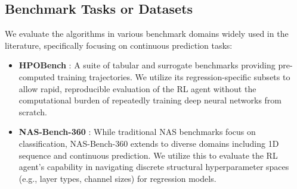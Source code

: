\documentclass[12pt]{article}
\begin{document}
\subsection*{Benchmark Tasks or Datasets}
We evaluate the algorithms in various benchmark domains widely used in the literature, specifically focusing on continuous prediction tasks:
\begin{itemize}
    \item \textbf{HPOBench} \citep{eggensperger2021hpobench}: A suite of tabular and surrogate benchmarks providing pre-computed training trajectories. We utilize its regression-specific subsets to allow rapid, reproducible evaluation of the RL agent without the computational burden of repeatedly training deep neural networks from scratch.
    \item \textbf{NAS-Bench-360} \citep{tu2021nasbench360}: While traditional NAS benchmarks focus on classification, NAS-Bench-360 extends to diverse domains including 1D sequence and continuous prediction. We utilize this to evaluate the RL agent's capability in navigating discrete structural hyperparameter spaces (e.g., layer types, channel sizes) for regression models.
\end{itemize}



\end{document}
